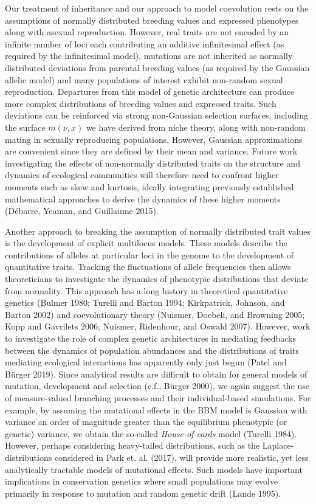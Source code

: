 \documentclass[]{article}
\begin{document}
Our treatment of inheritance and our approach to model coevolution rests
on the assumptions of normally distributed breeding values and expressed
phenotypes along with asexual reproduction. However, real traits are not
encoded by an infinite number of loci each contributing an additive
infinitesimal effect (as required by the infinitesimal model), mutations
are not inherited as normally distributed deviations from parental
breeding values (as required by the Gaussian allelic model) and many
populations of interest exhibit non-random sexual reproduction.
Departures from this model of genetic architecture can produce more
complex distributions of breeding values and expressed traits. Such
deviations can be reinforced via strong non-Gaussian selection surfaces,
including the surface \(m(\nu,x)\) we have derived from niche theory,
along with non-random mating in sexually reproducing populations.
However, Gaussian approximations are convenient since they are defined
by their mean and variance. Future work investigating the effects of
non-normally distributed traits on the structure and dynamics of
ecological communities will therefore need to confront higher moments
such as skew and kurtosis, ideally integrating previously established
mathematical approaches to derive the dynamics of these higher moments
(Débarre, Yeaman, and Guillaume 2015).

Another approach to breaking the assumption of normally distributed
trait values is the development of explicit multilocus models. These
models describe the contributions of alleles at particular loci in the
genome to the development of quantitative traits. Tracking the
fluctuations of allele frequencies then allows theoreticians to
investigate the dynamics of phenotypic distributions that deviate from
normality. This approach has a long history in theoretical quantitative
genetics (Bulmer 1980; Turelli and Barton 1994; Kirkpatrick, Johnson,
and Barton 2002) and coevolutionary theory (Nuismer, Doebeli, and
Browning 2005; Kopp and Gavrilets 2006; Nuismer, Ridenhour, and Oswald
2007). However, work to investigate the role of complex genetic
architectures in mediating feedbacks between the dynamics of population
abundances and the distributions of traits mediating ecological
interactions has apparently only just begun (Patel and Bürger 2019).
Since analytical results are difficult to obtain for general models of
mutation, development and selection (c.f., Bürger 2000), we again
suggest the use of measure-valued branching processes and their
individual-based simulations. For example, by assuming the mutational
effects in the BBM model is Gaussian with variance an order of magnitude
greater than the equilibrium phenotypic (or genetic) variance, we obtain
the so-called \emph{House-of-cards} model (Turelli 1984). However,
perhaps considering heavy-tailed distributions, such as the
Laplace-distributions considered in Park et. al. (2017), will provide
more realistic, yet less analytically tractable models of mutational
effects. Such models have important implications in conservation
genetics where small populations may evolve primarily in response to
mutation and random genetic drift (Lande 1995).
\end{document}
